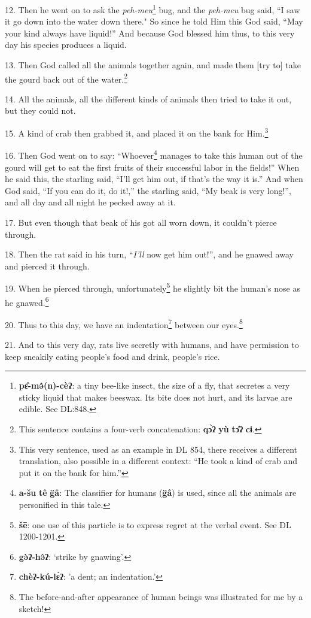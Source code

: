12. Then he went on to ask the \textit{peh-meu}\footnote{\textbf{pɛ̂-mə̂(n)-cèʔ}: a tiny bee-like insect, the size of a fly, that secretes a very sticky liquid that makes beeswax. Its bite does not hurt, and its larvae are edible. See DL:848.} bug, and the \textit{peh-meu}
bug said, ``I saw it go down into the water down there." So since he
told Him this God said, ``May your kind always have liquid!'' And because God
blessed him thus, to this very day his species produces a liquid.

13. Then God called all the animals together again, and made them [try to] take
the gourd back out of the water.\footnote{This sentence contains a four-verb concatenation: \textbf{qɔ̀ʔ} \textbf{yù} \textbf{tɔ̂ʔ} \textbf{cɨ}.}

14. All the animals, all the different kinds of animals then tried to take it out,
but they could not.

15. A kind of crab then grabbed it, and placed it on the bank for Him.\footnote{This very sentence, used as an example in DL 854, there receives a different translation, also possible in a different context: ``He took a kind of crab and put it on the bank for him.''}

16. Then God went on to say: ``Whoever\footnote{\textbf{a-šu} \textbf{tê} \textbf{g̈â}: The classifier for humans (\textbf{g̈â}) is used, since all the animals are personified in this tale.} manages to take this human out of the
gourd will get to eat the first fruits of their successful labor in the fields!''
When he said this, the starling said, ``I'll get him out, if that's the way it
is.'' And when God said, ``If you can do it, do it!,'' the starling said, ``My
beak is very long!'', and all day and all night he pecked away at it.

17. But even though that beak of his got all worn down, it couldn't pierce through.

18. Then the rat said in his turn, ``\textit{I'll} now get him out!'', and he gnawed
away and pierced it through.

19. When he pierced through, unfortunately\footnote{\textbf{šē}: one use of this particle is to express regret at the verbal event. See DL 1200-1201.} he slightly bit the human's nose
as he gnawed.\footnote{\textbf{gə̀ʔ-hə̂ʔ}: `strike by gnawing'.}

20. Thus to this day, we have an indentation\footnote{\textbf{chèʔ-kú-lɛ̀ʔ}: 'a dent; an indentation.'} between our eyes.\footnote{The before-and-after appearance of human beings was illustrated for me by a sketch!}

21. And to this very day, rats live secretly with humans, and have permission to
keep sneakily eating people's food and drink, people's rice.

